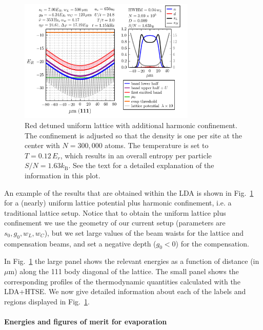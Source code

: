 \begin{figure}
    \centering
\includegraphics[width=0.75\textwidth]{../figures/lda_evap/figures_hubbard-lda/005.png}
\caption{\small Red detuned uniform lattice with additional harmonic confinement.  The
confinement is adjusted so that the density is one per site at the center with
$N=300,000$ atoms.   The temperature is set to $T=0.12\,E_{r}$, which results
in an overall entropy per particle  $S/N=1.63k_{\text{B}}$. See the text for a
detailed explanation of the information in this plot.}  
      \label{fig:HTSE_LDA_harmonic}
\end{figure}
 
An example of the results that are obtained within the LDA is shown in
Fig.~\ref{fig:HTSE_LDA_harmonic} for a (nearly) uniform lattice potential plus
harmonic confinement, i.e. a traditional lattice setup.  Notice that to obtain
the uniform lattice plus confinement we use the geometry of our current setup
(parameters are $s_{0},g_{0}, w_{L}, w_{C}$), but we set large values of the
beam waists for the lattice and compensation beams, and set a negative depth
($g_{0}<0$) for the compensation.  

In Fig.~\ref{fig:HTSE_LDA_harmonic} the large panel shows the
relevant energies as a function of distance (in $\mu$m) along the 111 body
diagonal of the lattice.   The small panel shows the corresponding profiles of
the thermodynamic quantities calculated with the LDA+HTSE. We now give detailed
information about each of the labels and regions displayed in
Fig.~\ref{fig:HTSE_LDA_harmonic}.

\paragraph{Energies and figures of merit for evaporation} 

